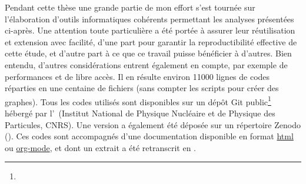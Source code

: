 \newpage

Pendant cette thèse une grande partie de mon effort s'est tournée sur l'élaboration d'outils informatiques cohérents  permettant les analyses présentées ci-après.
Une attention toute particulière a été portée à assurer leur réutilisation et extension avec facilité, d'une part pour garantir la reproductibilité effective de cette étude, et d'autre part à ce que ce travail puisse bénéficier à d'autres.
Bien entendu, d'autres considérations entrent également en compte, par exemple de performances et de libre accès.
Il en résulte environ \num{11000} lignes de codes réparties en une centaine de fichiers (sans compter les scripts pour créer des graphes).
Tous les codes utilisés sont disponibles sur un dépôt Git public\footnote{} hébergé par l'~(Institut National de Physique Nucléaire et de Physique des Particules, CNRS).
Une version a également été déposée sur un répertoire Zenodo (\hbox{}).
Ces codes sont accompagnés d'une documentation disponible en format \href{https://clementhaeck.pages.in2p3.fr/submeso-color/}{\textsf{html}} ou \href{https://gitlab.in2p3.fr/clementhaeck/submeso-color/-/blob/develop/docs/index.org}{\textsf{org-mode}}, et dont un extrait a été retranscrit en .

